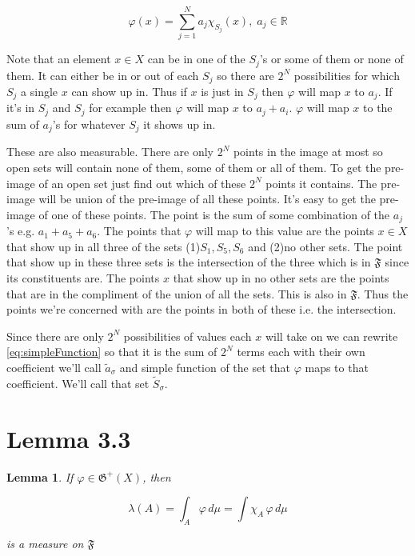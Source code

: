 \documentclass[oneside]{book}
\newtheorem{lemma}[theorem]{Lemma}
\begin{document}
\begin{equation}
\label{eq:simpleFunction}
\varphi(x)=\sum_{j=1}^N a_j \chi_{S_j}(x),\; a_j \in \mathbb{R}
\end{equation}

Note that an element $x \in X$ can be in one of the $S_j$'s or some of them or none of them. It can either be in or out of each $S_j$ so there are $2^N$ possibilities for which $S_j$ a single $x$ can show up in. Thus if $x$ is just in $S_j$ then $\varphi$ will map $x$ to $a_j$. If it's in $S_j$ and $S_j$ for example then $\varphi$ will map $x$ to $a_j+a_i$. $\varphi$ will map $x$ to the sum of $a_j$'s for whatever $S_j$ it shows up in. 

These are also measurable. There are only $2^N$ points in the image at most so open sets will contain none of them, some of them or all of them. To get the pre-image of an open set just find out which of these $2^N$ points it contains. The pre-image will be union of the pre-image of all these points. It's easy to get the pre-image of one of these points. The point is the sum of some combination of the $a_j$'s e.g. $a_1+a_5+a_6$. The points that $\varphi$ will map to this value are the points $x \in X$ that show up in all three of the sets (1)$S_1,S_5,S_6$ and (2)no other sets. The point that show up in these three sets is the intersection of the three which is in $\mathfrak{F}$ since its constituents are. The points $x$ that show up in no other sets are the points that are in the compliment of the union of all the sets. This is also in $\mathfrak{F}$. Thus the points we're concerned with are the points in both of these i.e. the intersection.

Since there are only $2^N$ possibilities of values each $x$ will take on we can rewrite \ref{eq:simpleFunction} so that it is the sum of $2^N$ terms each with their own coefficient we'll call $\tilde{a}_\sigma$ and simple function of the set that $\varphi$ maps to that coefficient. We'll call that set $\tilde{S}_\sigma$. 

\section{Lemma 3.3}
\begin{lemma}
If $\varphi \in \mathfrak{G}^+(X)$, then

\begin{equation}
\lambda(A) = \int_A \varphi\, d\mu = \int \chi_A \,\varphi\, d\mu
\end{equation}

is a measure on $\mathfrak{F}$
\end{lemma}
\end{document}
